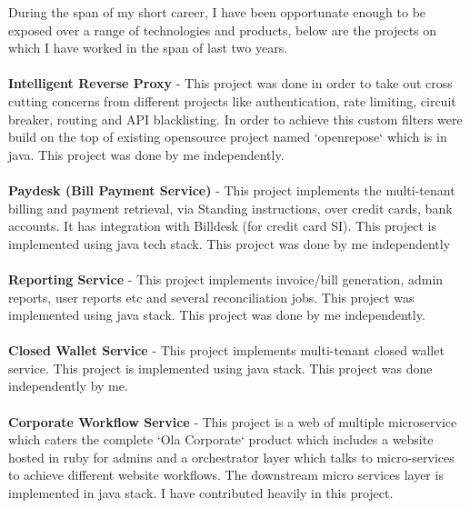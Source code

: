 \documentclass[10pt,a4paper]{article}
\begin{document}
\vspace{-1.3em}  %
\begin{multicols}{2}  %
\noindent
During the span of my short career, I have been opportunate enough to be exposed over a range of technologies and products, below are the projects on which I have worked in the span of last two years.
\\
\\
\textbf{Intelligent Reverse Proxy} -  This project was done in order to take out cross cutting concerns from different projects like authentication, rate limiting, circuit breaker, routing and API blacklisting. In order to achieve this custom filters were build on the top of existing opensource project named `openrepose` which is in java. This project was done by me independently.
\\
\\
\textbf{Paydesk (Bill Payment Service)} -  This project implements the multi-tenant billing and payment retrieval, via Standing instructions, over credit cards, bank accounts. It has integration with Billdesk (for credit card SI). This project is implemented using java tech stack. This project was done by me independently
\\
\\
\textbf{Reporting Service} - This project implements invoice/bill  generation, admin reports, user reports etc and several reconciliation jobs. This project was implemented using java stack. This project was done by me independently.
\\
\\
\textbf{Closed Wallet Service} - This project implements multi-tenant closed wallet service. This project is implemented using java stack. This project was done independently by me.
\\
\\
\textbf{Corporate Workflow Service} - This project is a web of multiple microservice which caters the complete `Ola Corporate` product which includes a website hosted in ruby for admins and a orchestrator layer which talks to micro-services to achieve different website workflows. The downstream micro services layer is implemented in java stack. I have contributed heavily in this project.


\end{multicols}


\spacedhrule{0em}{-0.4em}

\end{document}
